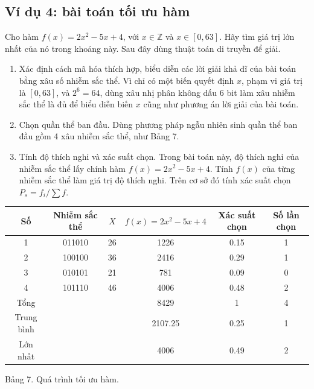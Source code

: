 \documentclass[11pt]{article}
\begin{document}
\subsection{Ví dụ 4: bài toán tối ưu hàm}

Cho hàm \(f(x)=2x^2-5x+4\), với \(x\in\mathbb{Z}\) và \(x\in[0,63]\). Hãy
tìm giá trị lớn nhất của nó trong khoảng này. Sau đây dùng thuật toán di
truyền để giải.

\begin{enumerate}
  \item Xác định cách mã hóa thích hợp, biểu diễn các lời giải khả dĩ của bài
  toán bằng xâu số nhiễm sắc thể. Vì chỉ có một biến quyết định \(x\), phạm
  vi giá trị là \([0,63]\), và \(2^6=64\), dùng xâu nhị phân không dấu 6 bit
  làm xâu nhiễm sắc thể là đủ để biểu diễn biến \(x\) cũng như phương án lời
  giải của bài toán.
  \item Chọn quần thể ban đầu. Dùng phương pháp ngẫu nhiên sinh quần thể ban
  đầu gồm 4 xâu nhiễm sắc thể, như Bảng 7.
  \item Tính độ thích nghi và xác suất chọn. Trong bài toán này, độ thích
  nghi của nhiễm sắc thể lấy chính hàm \(f(x)=2x^2-5x+4\). Tính \(f(x)\) của
  từng nhiễm sắc thể làm giá trị độ thích nghi. Trên cơ sở đó tính xác suất
  chọn \(P_s=f_i/\sum f\).
\end{enumerate}

\begin{center}
\begin{tabular}{c|ccccc}
Số & Nhiễm sắc thể & \(X\) & \(f(x)=2x^2-5x+4\) & Xác suất chọn & Số lần chọn\\ \hline
1 & 011010 & 26 & 1226 & 0.15 & 1\\
2 & 100100 & 36 & 2416 & 0.29 & 1\\
3 & 010101 & 21 & 781 & 0.09 & 0\\
4 & 101110 & 46 & 4006 & 0.48 & 2\\ \hline
Tổng & & & 8429 & 1 & 4\\
Trung bình & & & 2107.25 & 0.25 & 1\\
Lớn nhất & & & 4006 & 0.49 & 2
\end{tabular}

Bảng 7. Quá trình tối ưu hàm.
\end{center}
\end{document}
